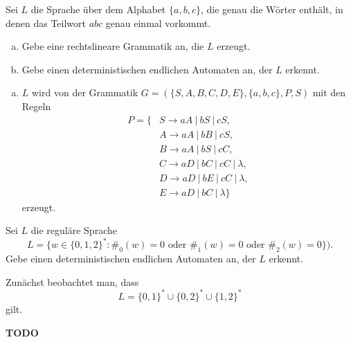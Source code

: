 \documentclass[german,headsepline]{scrartcl}
\theoremstyle{definition}
\begin{document}
	\begin{question}
		Sei $L$ die Sprache über dem Alphabet $\{a,b,c\}$, die genau die Wörter enthält,
		in denen das Teilwort $abc$ genau einmal vorkommt.
		\begin{enumerate}[(a)]
			\item Gebe eine rechtslineare Grammatik an, die $L$ erzeugt.
			\item Gebe einen deterministischen endlichen Automaten an, der $L$ erkennt.
		\end{enumerate}
	\end{question}
	\begin{solution}
		\begin{enumerate}[(a)]
			\item $L$ wird von der Grammatik $G=(\{S,A,B,C,D,E\},\{a,b,c\},P,S)$ mit den Regeln
				\begin{align*}
					P=\{&S\rightarrow aA~|~bS~|~cS, \\
					&A\rightarrow aA~|~bB~|~cS, \\
					&B\rightarrow aA~|~bS~|~cC, \\
					&C\rightarrow aD~|~bC~|~cC~|~\lambda, \\
					&D\rightarrow aD~|~bE~|~cC~|~\lambda, \\
					&E\rightarrow aD~|~bC~|~\lambda\}
				\end{align*}
				erzeugt.
		\end{enumerate}
	\end{solution}
	
	\begin{question}
		Sei $L$ die reguläre Sprache
		\[L=\{w\in\{0,1,2\}^*\colon\#_0(w)=0\text{ oder }\#_1(w)=0\text{ oder }\#_2(w)=0\}).\]
		Gebe einen deterministischen endlichen Automaten an, der $L$ erkennt.
	\end{question}
	\begin{solution}
		Zunächst beobachtet man, dass
		\[L=\{0,1\}^*\cup\{0,2\}^*\cup\{1,2\}^*\]
		gilt.
		
		\textbf{TODO}
	\end{solution}
\end{document}
